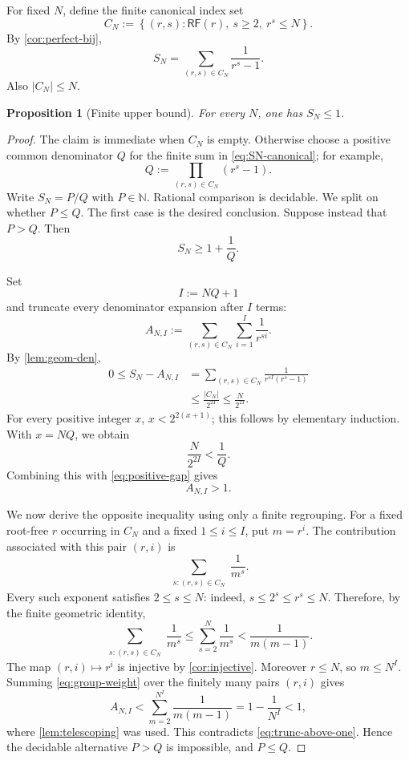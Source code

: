 \documentclass[11pt]{article}
\newtheorem{proposition}[theorem]{Proposition}
\theoremstyle{definition}
\newcommand{\N}{\mathbb N}
\newcommand{\RF}{\mathsf{RF}}
\newcommand{\set}[1]{\left\{#1\right\}}
\begin{document}
For fixed $N$, define the finite canonical index set
\[
  C_N:=\set{(r,s):\RF(r),\ s\ge2,\ r^s\le N}.
\]
By \cref{cor:perfect-bij},
\begin{equation}\label{eq:SN-canonical}
  S_N=\sum_{(r,s)\in C_N}\frac1{r^s-1}.
\end{equation}
Also $|C_N|\le N$.

\begin{proposition}[Finite upper bound]\label{prop:upper}
For every $N$, one has $S_N\le1$.
\end{proposition}

\begin{proof}
The claim is immediate when $C_N$ is empty.  Otherwise choose a positive common
denominator $Q$ for the finite sum in \eqref{eq:SN-canonical}; for example,
\[
  Q:=\prod_{(r,s)\in C_N}(r^s-1).
\]
Write $S_N=P/Q$ with $P\in\N$.  Rational comparison is decidable.  We split on
whether $P\le Q$.  The first case is the desired conclusion.  Suppose instead
that $P>Q$.  Then
\begin{equation}\label{eq:positive-gap}
  S_N\ge1+\frac1Q.
\end{equation}

Set
\[
  I:=NQ+1
\]
and truncate every denominator expansion after $I$ terms:
\[
  A_{N,I}:=
  \sum_{(r,s)\in C_N}\sum_{i=1}^{I}\frac1{r^{si}}.
\]
By \cref{lem:geom-den},
\[
\begin{aligned}
  0\le S_N-A_{N,I}
   &=\sum_{(r,s)\in C_N}
     \frac1{r^{sI}(r^s-1)}\\
   &\le \frac{|C_N|}{2^{2I}}
    \le \frac{N}{2^{2I}}.
\end{aligned}
\]
For every positive integer $x$, $x<2^{2(x+1)}$; this follows by elementary
induction.  With $x=NQ$, we obtain
\[
  \frac{N}{2^{2I}}<\frac1Q.
\]
Combining this with \eqref{eq:positive-gap} gives
\begin{equation}\label{eq:trunc-above-one}
  A_{N,I}>1.
\end{equation}

We now derive the opposite inequality using only a finite regrouping.  For a
fixed root-free $r$ occurring in $C_N$ and a fixed $1\le i\le I$, put
$m=r^i$.  The contribution associated with this pair $(r,i)$ is
\[
  \sum_{\substack{s:(r,s)\in C_N}}\frac1{m^s}.
\]
Every such exponent satisfies $2\le s\le N$: indeed,
$s\le2^s\le r^s\le N$.  Therefore, by the finite geometric identity,
\begin{equation}\label{eq:group-weight}
  \sum_{\substack{s:(r,s)\in C_N}}\frac1{m^s}
  \le\sum_{s=2}^{N}\frac1{m^s}
  <\frac1{m(m-1)}.
\end{equation}
The map $(r,i)\mapsto r^i$ is injective by
\cref{cor:injective}.  Moreover $r\le N$, so $m\le N^I$.  Summing
\eqref{eq:group-weight} over the finitely many pairs $(r,i)$ gives
\[
  A_{N,I}
  <\sum_{m=2}^{N^I}\frac1{m(m-1)}
  =1-\frac1{N^I}<1,
\]
where \cref{lem:telescoping} was used.  This contradicts
\eqref{eq:trunc-above-one}.  Hence the decidable alternative $P>Q$ is
impossible, and $P\le Q$.
\end{proof}
\end{document}
